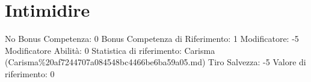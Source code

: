 \section{Intimidire}\label{intimidire}

\begin{description}
\tightlist
\item[Tags: ABI]
No Bonus Competenza: 0 Bonus Competenza di Riferimento: 1 Modificatore:
-5 Modificatore Abilità: 0 Statistica di riferimento: Carisma
(Carisma\%20af7244707a084548bc4466be6ba59a05.md) Tiro Salvezza: -5
Valore di riferimento: 0
\end{description}

